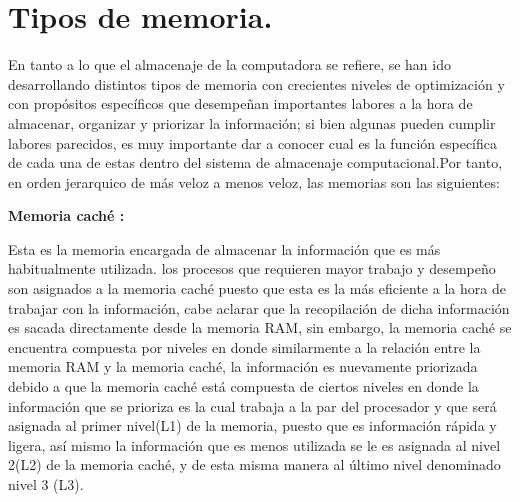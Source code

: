 \documentclass[12pt]{article}
\begin{document}
\section{Tipos de memoria.} \label{contenido}
En tanto a lo que el almacenaje de la computadora se refiere, se han ido desarrollando distintos tipos de memoria con crecientes niveles de optimización y con propósitos específicos que desempeñan importantes labores a la hora de almacenar, organizar y priorizar la información; si bien algunas pueden cumplir labores parecidos, es muy importante dar a conocer cual es la función específica de cada una de estas dentro del sistema de almacenaje computacional.Por tanto, en orden jerarquico de más veloz a menos veloz, las memorias son las siguientes:
\begin{itemize}
\vspace{15PT}
\textbf{Memoria caché :}

Esta es la memoria encargada de almacenar la información que es más habitualmente utilizada. los procesos que requieren mayor trabajo y desempeño son asignados a la memoria caché puesto que esta es la más eficiente a la hora de trabajar con la información, cabe aclarar que la recopilación de dicha información es sacada directamente desde la memoria RAM, sin embargo, la memoria caché se encuentra compuesta por niveles en donde similarmente a la relación entre la memoria RAM y la memoria caché, la información es nuevamente priorizada debido a que la memoria caché está compuesta de ciertos niveles en donde la información que se prioriza es la cual  trabaja a la par del procesador y que será asignada al primer nivel(L1) de la memoria, puesto que es información rápida y ligera, así mismo la información que es menos utilizada se le es asignada al nivel 2(L2) de la memoria caché, y de esta misma manera al último nivel denominado nivel 3 (L3).


\end{itemize}
\end{document}
